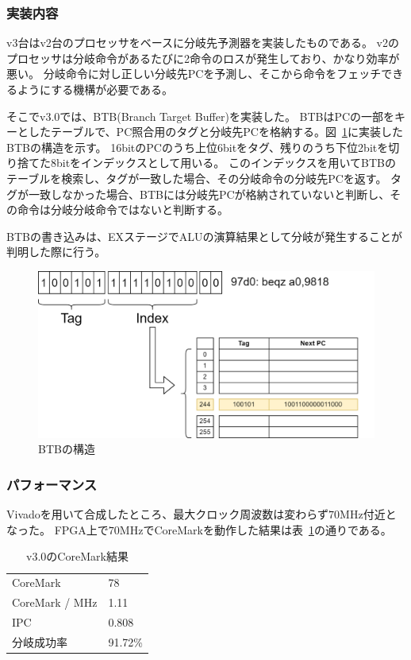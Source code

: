 \documentclass[dvipdfmx,10pt,a4paper,titlepage]{jsarticle}
\begin{document}
    \subsubsection{実装内容}
    v3台はv2台のプロセッサをベースに分岐先予測器を実装したものである。
    v2のプロセッサは分岐命令があるたびに2命令のロスが発生しており、かなり効率が悪い。
    分岐命令に対し正しい分岐先PCを予測し、そこから命令をフェッチできるようにする機構が必要である。

    そこでv3.0では、BTB(Branch Target Buffer)を実装した。
    BTBはPCの一部をキーとしたテーブルで、PC照合用のタグと分岐先PCを格納する。図~\ref{fig:btb}に実装したBTBの構造を示す。
    16bitのPCのうち上位6bitをタグ、残りのうち下位2bitを切り捨てた8bitをインデックスとして用いる。
    このインデックスを用いてBTBのテーブルを検索し、タグが一致した場合、その分岐命令の分岐先PCを返す。
    タグが一致しなかった場合、BTBには分岐先PCが格納されていないと判断し、その命令は分岐分岐命令ではないと判断する。
    
    BTBの書き込みは、EXステージでALUの演算結果として分岐が発生することが判明した際に行う。
    \begin{figure}[h]
        \centering
        \includegraphics[width=12cm]{figure/btb.png}
        \caption{BTBの構造}\label{fig:btb}
    \end{figure}
    \subsubsection{パフォーマンス}
    Vivadoを用いて合成したところ、最大クロック周波数は変わらず$70\mathrm{MHz}$付近となった。
    FPGA上で$70\mathrm{MHz}$でCoreMarkを動作した結果は表~\ref{tab:v3.0}の通りである。
    \begin{table}[h]
        \begin{center}
            \caption{v3.0のCoreMark結果}\label{tab:v3.0}
            \begin{tabular}{ll}
                CoreMark & 78 \\
                CoreMark / MHz & 1.11 \\
                IPC & 0.808 \\
                分岐成功率 & 91.72\% \\
            \end{tabular}
        \end{center}
    \end{table}
\end{document}
